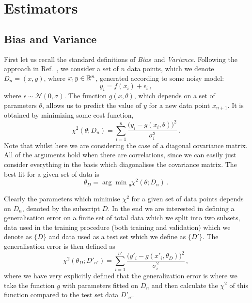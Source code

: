 \section{Estimators}
\label{sec:estimators}

\subsection{Bias and Variance}
\label{sec:BandV}

First let us recall the standard definitions of {\em Bias}\ and {\em Variance}.
Following the approach in Ref.~\cite{Mehta:2018dln}, we consider a set of $n$
data points, which we denote $D_n=\left(x,y\right)$, where $x,y \in \mathbb{R}^n$,
generated according to some noisy model:
\begin{equation}
    \label{eq:NoisyData}
    y_i = f(x_i) + \epsilon_i\, ,
\end{equation}
where $\epsilon\sim\mathcal{N}(0,\sigma)$. The function $g(x,\theta)$, which
depends on a set of parameters $\theta$, allows us to predict the value of $y$
for a new data point $x_{n+1}$. It is obtained by minimizing some cost function,
\eg
\begin{equation}
    \label{eq:CostFuncChi}
    \chi^2(\theta; D_n) = \sum_{i=1}^n
    \frac{\Big(
        y_i - g(x_i,\theta)
    \Big)^2}{\sigma_i^2}\, .
\end{equation}
Note that whilst here we are considering the case of a diagonal covariance matrix.
All of the arguments hold when there are correlations, since we can easily just
consider everything in the basis which diagonalises the covariance matrix. The
best fit for a given set of data is
\begin{equation}
    \label{eq:ThetaMin}
    \theta_D = {\arg\min}_\theta \chi^2(\theta; D_n)\, .
\end{equation}

Clearly the parameters which minimise $\chi^2$ for a given set of data points
depends on $D_n$, denoted by the subscript $D$. In the end we are interested in
defining a generalisation error on a finite set of total data which we split
into two subsets, data used in the training procedure
(both training and validation) which we denote as $\{ D \}$
and data used as a test set which we define as $\{ D' \}$. The generalisation
error is then defined as
\begin{equation}
    \label{eq:DefGenErr}
    \chi^2(\theta_D; D'_{n'}) = \sum_{i=1}^{n'}
    \frac{\Big(
        y'_i - g(x'_i,\theta_D)
    \Big)^2}{\sigma_i^2}\, ,
\end{equation}
where we have very explicitly defined that the generalization error is where we
take the function $g$ with parameters fitted on $D_n$ and then calculate the
$\chi^2$ of this function compared to the test set data $D'_{n'}$.

